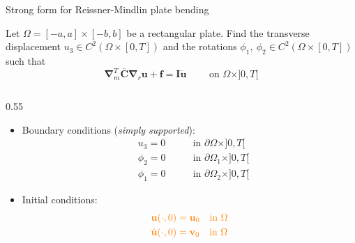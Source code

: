\documentclass[aspectratio=169]{beamer}
\begin{document}
{  \begin{frame}{Strong form for Reissner-Mindlin plate bending}
    \begin{block}{}
      Let $\Omega=[-a,a]\times[-b,b]$ be a rectangular plate. Find the transverse displacement $u_{3}\in C^2(\Omega\times[0,T])$ and the rotations $\phi_1,\ \phi_2\in C^2(\Omega\times[0,T])$ such that
      $$
        \boldsymbol\nabla_m^T \overline{\boldsymbol{C}}\boldsymbol\nabla_r\mathbf{u}+\mathbf f=\mathbf{I} \ddot{\mathbf u} \qquad \text{  on  }\Omega\times]0,T[
      $$
      \vspace{-0.5cm}
      \begin{columns}
        \begin{column}{0.55\textwidth}
          \begin{itemize}
            \item Boundary conditions (\emph{simply supported}):
                  \vspace{-0.2cm}
                  \[
                    \begin{aligned}
                       & u_3 = 0\qquad   & \text{in }\partial\Omega\times]0,T[   \\
                       & \phi_2 =0\qquad & \text{in }\partial\Omega_1\times]0,T[ \\
                       & \phi_1 =0\qquad & \text{in }\partial\Omega_2\times]0,T[
                    \end{aligned}
                  \]
            \item Initial conditions:
                  \vspace{-0.2cm}
                  \[
                    \begin{aligned}
                       & \color{orange}{\mathbf u(\cdot, 0) =  \mathbf u_0 \quad \text{in }\Omega}      \\
                       & \color{orange}{\dot{\mathbf u}(\cdot, 0) = \mathbf v_0 \quad \text{in }\Omega} \\
                    \end{aligned}
                  \]
          \end{itemize}
        \end{column}


\end{columns}
\end{block}
\end{frame}}
\end{document}
